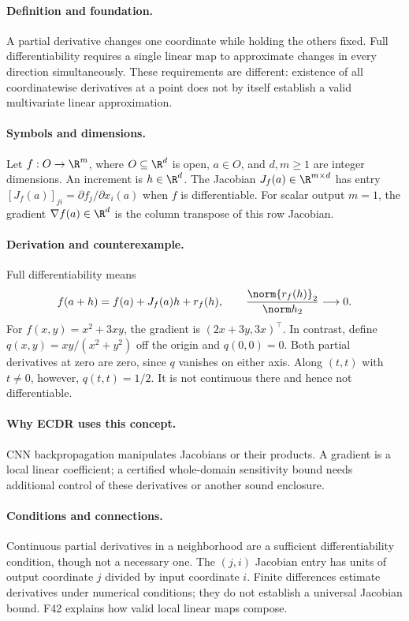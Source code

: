 \paragraph{Definition and foundation.}
A partial derivative changes one coordinate while holding the others fixed. Full differentiability requires a single linear map to approximate changes in every direction simultaneously. These requirements are different: existence of all coordinatewise derivatives at a point does not by itself establish a valid multivariate linear approximation.
\paragraph{Symbols and dimensions.}
Let $f:O\to\R^m$, where $O\subseteq\R^d$ is open, $a\in O$, and $d,m\ge1$ are integer dimensions. An increment is $h\in\R^d$. The Jacobian $J_f(a)\in\R^{m\times d}$ has entry $[J_f(a)]_{ji}=\partial f_j/\partial x_i(a)$ when $f$ is differentiable. For scalar output $m=1$, the gradient $\nabla f(a)\in\R^d$ is the column transpose of this row Jacobian.
\paragraph{Derivation and counterexample.}
Full differentiability means
\[
 f(a+h)=f(a)+J_f(a)h+r_f(h),\qquad
 \frac{\norm{r_f(h)}_2}{\norm h_2}\longrightarrow0.
\]
For $f(x,y)=x^2+3xy$, the gradient is $(2x+3y,3x)^\top$. In contrast, define $q(x,y)=xy/(x^2+y^2)$ off the origin and $q(0,0)=0$. Both partial derivatives at zero are zero, since $q$ vanishes on either axis. Along $(t,t)$ with $t\ne0$, however, $q(t,t)=1/2$. It is not continuous there and hence not differentiable.
\paragraph{Why ECDR uses this concept.}
CNN backpropagation manipulates Jacobians or their products. A gradient is a local linear coefficient; a certified whole-domain sensitivity bound needs additional control of these derivatives or another sound enclosure.
\paragraph{Conditions and connections.}
Continuous partial derivatives in a neighborhood are a sufficient differentiability condition, though not a necessary one. The $(j,i)$ Jacobian entry has units of output coordinate $j$ divided by input coordinate $i$. Finite differences estimate derivatives under numerical conditions; they do not establish a universal Jacobian bound. F42 explains how valid local linear maps compose.

